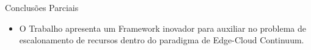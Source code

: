\begin{frame}{Conclusões Parciais}
    \begin{itemize}
        \item O Trabalho apresenta um Framework inovador para auxiliar no problema de escalonamento de recursos dentro do paradigma de Edge-Cloud Continuum.
    \end{itemize}
\end{frame}